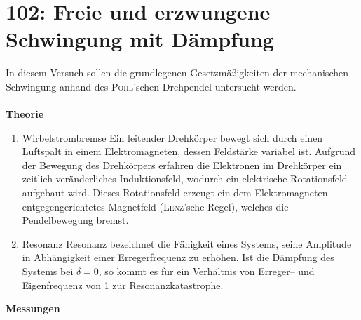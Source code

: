 \section{102: Freie und erzwungene Schwingung mit Dämpfung}
In diesem Versuch sollen die grundlegenen Gesetzmäßigkeiten der mechanischen Schwingung anhand des \textsc{Pohl}'schen Drehpendel untersucht werden.\\\\
\textbf{Theorie} 
\begin{enumerate}[label=--]
        \item Wirbelstrombremse \hspace{25pt}
                Ein leitender Drehkörper bewegt sich durch einen Luftspalt in einem Elektromagneten, dessen Feldstärke variabel ist. 
                Aufgrund der Bewegung des Drehkörpers erfahren die Elektronen im Drehkörper ein zeitlich veränderliches Induktionsfeld, wodurch ein elektrische Rotationsfeld aufgebaut wird. 
                Dieses Rotationsfeld erzeugt ein dem Elektromagneten entgegengerichtetes Magnetfeld (\textsc{Lenz}'sche Regel), welches die Pendelbewegung bremst.
        \item Resonanz \hspace{25pt} 
                Resonanz bezeichnet die Fähigkeit eines Systems, seine Amplitude in Abhängigkeit einer Erregerfrequenz zu erhöhen.
                Ist die Dämpfung des Systems bei $\delta =0$, so kommt es für ein Verhältnis von Erreger-- und Eigenfrequenz von 1 zur Resonanzkatastrophe.
\end{enumerate}
\textbf{Messungen} 
